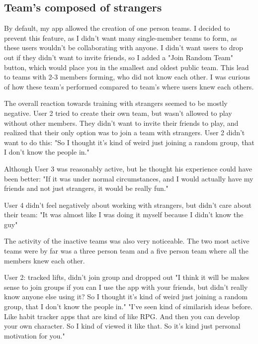 \documentclass{l4proj}
\begin{document}
\subsection{Team's composed of strangers}
By default, my app allowed the creation of one person teams. I decided to prevent this feature, as I didn't want many single-member teams to form, as these users wouldn't be collaborating with anyone. I didn't want users to drop out if they didn't want to invite friends, so I added a "Join Random Team" button, which would place you in the smallest and oldest public team. This lead to teams with 2-3 members forming, who did not know each other. I was curious of how these team's performed compared to team's where users knew each others.

The overall reaction towards training with strangers seemed to be mostly negative. User 2 tried to create their own team, but wasn't allowed to play without other members. They didn't want to invite their friends to play, and realized that their only option was to join a team with strangers. User 2 didn't want to do this: "So I thought it's kind of weird just joining a random group, that I don't know the people in."

Although User 3 was reasonably active, but he thought his experience could have been better: "If it was under normal circumstances, and I would actually have my friends and not just strangers, it would be really fun." 

User 4 didn't feel negatively about working with strangers, but didn't care about their team: "It was almost like I was doing it myself because I didn't know the guy" 

The activity of the inactive teams was also very noticeable. The two most active teams were by far was a three person team and a five person team where all the members knew each other. 





    

User 2: tracked lifts, didn't join group and dropped out
  "I think it will be makes sense to join groups if you can I use the app with your friends, but didn't really know anyone else using it? So I thought it's kind of weird just joining a random group, that I don't know the people in."
  "I've seen kind of similarish ideas before. Like habit tracker apps that are kind of like RPG. And then you can develop your own character. So I kind of viewed it like that. So it's kind just personal motivation for you."
\end{document}

